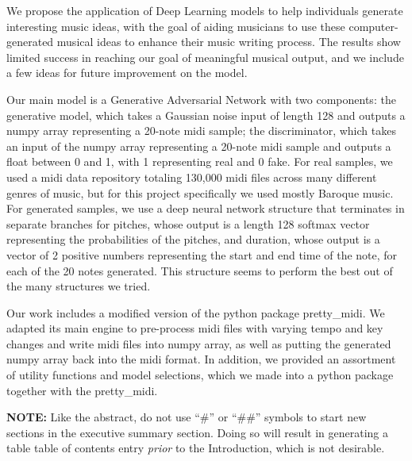 \documentclass[12pt,oneside]{chicagocapstone}
\begin{document}
  \begin{executive}
    We propose the application of Deep Learning models to help individuals generate interesting music ideas, with the goal of aiding musicians to use these computer-generated musical ideas to enhance their music writing process. The results show limited success in reaching our goal of meaningful musical output, and we include a few ideas for future improvement on the model.
    
    Our main model is a Generative Adversarial Network with two components: the generative model, which takes a Gaussian noise input of length 128 and outputs a numpy array representing a 20-note midi sample; the discriminator, which takes an input of the numpy array representing a 20-note midi sample and outputs a float between 0 and 1, with 1 representing real and 0 fake. For real samples, we used a midi data repository totaling 130,000 midi files across many different genres of music, but for this project specifically we used mostly Baroque music. For generated samples, we use a deep neural network structure that terminates in separate branches for pitches, whose output is a length 128 softmax vector representing the probabilities of the pitches, and duration, whose output is a vector of 2 positive numbers representing the start and end time of the note, for each of the 20 notes generated. This structure seems to perform the best out of the many structures we tried.
    
    Our work includes a modified version of the python package pretty\_midi. We adapted its main engine to pre-process midi files with varying tempo and key changes and write midi files into numpy array, as well as putting the generated numpy array back into the midi format. In addition, we provided an assortment of utility functions and model selections, which we made into a python package together with the pretty\_midi.
    
    \bigskip
    \bigskip
    \bigskip
    
    \textbf{NOTE:} Like the abstract, do not use ``\#'' or ``\#\#'' symbols to start new sections in the executive summary section. Doing so will result in generating a table table of contents entry \emph{prior} to the Introduction, which is not desirable.
  \end{executive}




  \hypersetup{linkcolor=black}
  \setcounter{tocdepth}{2}
  \tableofcontents

  \listoffigures
\end{document}
